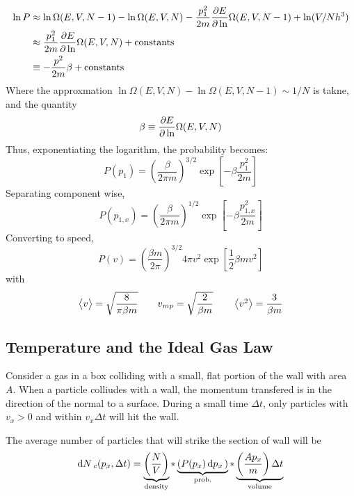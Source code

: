 \begin{align*}
	\ln P &\approx \ln\Omega (E,V,N-1)-\ln\Omega (E,V,N) - \frac{p^2_1}{2m}\frac{\partial E}{\partial \ln}\Omega(E,V,N-1)+\ln(V/Nh^3)\\
	      &\approx \frac{p^2_1}{2m}\frac{\partial E}{\partial \ln}\Omega(E,V,N)+\text{constants}\\
	      &\equiv -\frac{p^2}{2m}\beta+\text{constants}
\end{align*}
Where the approxmation \(\ln\Omega( E, V, N) - \ln\Omega (E, V, N-1)\sim1/N\) is takne, and the quantity
\begin{equation}
	\beta \equiv \frac{\partial E}{\partial \ln}\Omega (E,V,N)
\end{equation}
Thus, exponentiating the logarithm, the probability becomes:
\begin{equation}
	P(p_1) = \left(\frac{\beta}{2\pi m}\right)^{3/2}\exp\left[-\beta \frac{p^2_1}{2m}\right]
\end{equation}
Separating component wise, 
\begin{equation}
	P(p_{1,x}) = \left(\frac{\beta}{2\pi m}\right)^{1/2}\exp\left[-\beta \frac{p^2_{1,x}}{2m}\right]
\end{equation}
Converting to speed,
\begin{equation}
P(v) = \left(\frac{\beta m}{2\pi}\right)^{3/2}4\pi v^2\exp\left[\frac{1}{2}\beta m v^2\right]
\end{equation}
with 
\begin{equation}
	\left\langle \begin{matrix}v\end{matrix} \right\rangle=\sqrt{\frac{8}{\pi \beta m}} \qquad v_{mp} = \sqrt{\frac{2}{\beta m}} \qquad \left\langle \begin{matrix}v^2\end{matrix} \right\rangle=\frac{3}{\beta m}
\end{equation}

\subsection{Temperature and the Ideal Gas Law}
Consider a gas in a box colliding with a small, flat portion of the wall with area \(A\).
When a particle colliudes with a wall, the momentum transfered is in the direction of the normal to a surface.
During a small time \(\Delta t\), only particles with \(v_x>0\) and within \(v_x\Delta t\) will hit the wall. 

The average number of particles that will strike the section of wall will be 
\begin{equation}
	\d{N}_c(p_x, \Delta t) = \underbrace{\left(\frac{N}{V}\right)}_{\text{density}}*\underbrace{(P(p_x)\d{p_x})}_{\text{prob.}}*\underbrace{\left(\frac{Ap_x}{m}\right)\Delta t}_{\text{volume}}
\end{equation}

